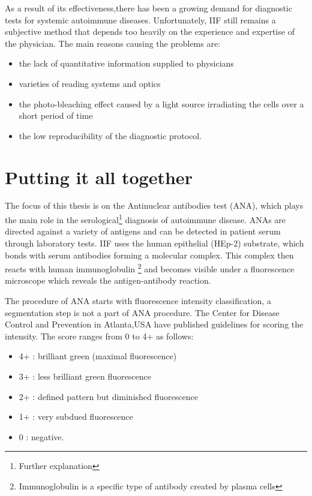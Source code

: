 As a result of its effectiveness,there has been a growing demand for diagnostic tests for systemic autoimmune diseases. Unfortunately,  IIF still remains a subjective method that depends too heavily on the experience and expertise of the physician. The main reasons causing the problems are:
\begin{itemize}
	\item the lack of quantitative information supplied to physicians
	\item varieties of reading systems and optics
	\item the photo-bleaching effect caused by a light source irradiating the cells over a short period of time
	\item the low reproducibility of the diagnostic protocol.
\end{itemize}

\section{Putting it all together}

The focus of this thesis is on the Antinuclear antibodies  test (ANA), which plays the main role in the serological\footnote{Further explanation} diagnosis of autoimmune disease. ANAs are directed against a variety of antigens and can be detected in patient serum through laboratory tests. IIF uses the human epithelial (HEp-2) substrate, which bonds with serum antibodies forming a molecular complex. This complex then reacts with human immunoglobulin \footnote{Immunoglobulin is a specific type of antibody created by plasma cells} and becomes visible under a fluorescence microscope which reveals the antigen-antibody reaction.

The procedure of ANA starts with  fluorescence intensity classification, a segmentation step is not a part of ANA procedure. The Center for Disease Control and Prevention in Atlanta,USA have published  guidelines \cite{nakamura1996quality} for scoring the intensity. The score ranges from 0 to 4+ as follows:
\begin{itemize}
	\item 4+ : brilliant green (maximal fluorescence)
	\item 3+ : less brilliant green fluorescence
	\item 2+ : defined pattern but diminished fluorescence
	\item 1+ : very subdued fluorescence
	\item 0 : negative.
\end{itemize}

